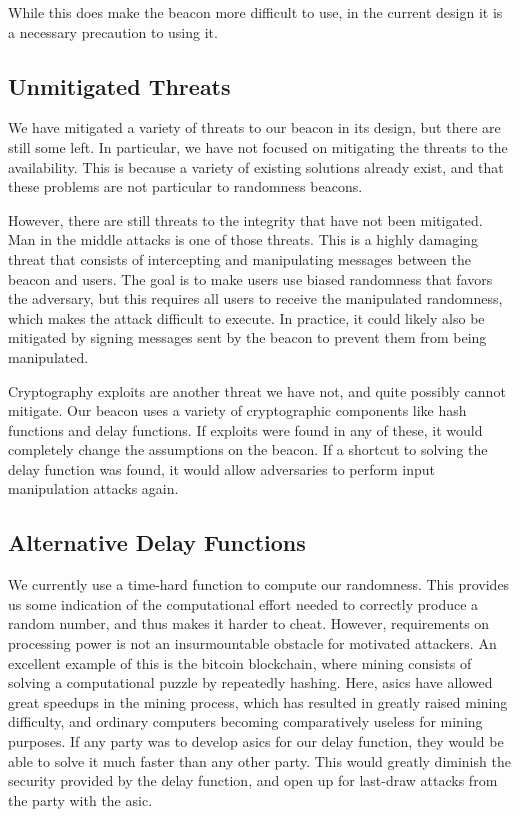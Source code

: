 While this does make the beacon more difficult to use, in the current design it is a necessary precaution to using it.

\subsection{Unmitigated Threats}
We have mitigated a variety of threats to our beacon in its design, but there are still some left. In particular, we have not focused on mitigating the threats to the availability. This is because a variety of existing solutions already exist, and that these problems are not particular to randomness beacons.

However, there are still threats to the integrity that have not been mitigated. Man in the middle attacks is one of those threats. This is a highly damaging threat that consists of intercepting and manipulating messages between the beacon and users. The goal is to make users use biased randomness that favors the adversary, but this requires all users to receive the manipulated randomness, which makes the attack difficult to execute. In practice, it could likely also be mitigated by signing messages sent by the beacon to prevent them from being manipulated.

Cryptography exploits are another threat we have not, and quite possibly cannot mitigate. Our beacon uses a variety of cryptographic components like hash functions and delay functions. If exploits were found in any of these, it would completely change the assumptions on the beacon.
If a shortcut to solving the delay function was found, it would allow adversaries to perform input manipulation attacks again.

\subsection{Alternative Delay Functions}
We currently use a time-hard function to compute our randomness. This provides us some indication of the computational effort needed to correctly produce a random number, and thus makes it harder to cheat.
However, requirements on processing power is not an insurmountable obstacle for motivated attackers. An excellent example of this is the bitcoin blockchain, where mining consists of solving a computational puzzle by repeatedly hashing. Here, \glspl{asic} have allowed great speedups in the mining process, which has resulted in greatly raised mining difficulty, and ordinary computers becoming comparatively useless for mining purposes.
If any party was to develop \glspl{asic} for our delay function, they would be able to solve it much faster than any other party. This would greatly diminish the security provided by the delay function, and open up for last-draw attacks from the party with the \gls{asic}.

